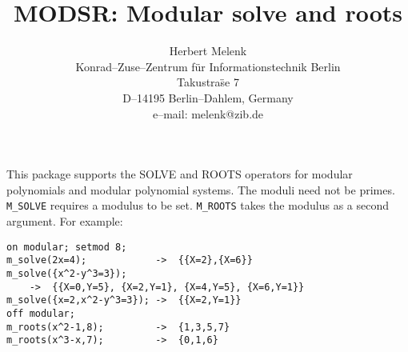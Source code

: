 \documentclass[12pt]{article}
\title{MODSR: Modular solve and roots}
\author{
Herbert Melenk \\
Konrad--Zuse--Zentrum f\"ur Informationstechnik Berlin \\
Takustra\"se 7 \\
D--14195 Berlin--Dahlem, Germany \\[0.05in]
e--mail: melenk@zib.de
}
\begin{document}
\maketitle

This package supports the SOLVE and ROOTS operators for modular polynomials
and modular polynomial systems.  The moduli need not be primes.  {\tt
M\_SOLVE} requires a modulus to be set.  {\tt M\_ROOTS} takes the
modulus as a second argument. For example:

\begin{verbatim}
on modular; setmod 8;
m_solve(2x=4);            ->  {{X=2},{X=6}}
m_solve({x^2-y^3=3});
    ->  {{X=0,Y=5}, {X=2,Y=1}, {X=4,Y=5}, {X=6,Y=1}}
m_solve({x=2,x^2-y^3=3}); ->  {{X=2,Y=1}}
off modular;
m_roots(x^2-1,8);         ->  {1,3,5,7}
m_roots(x^3-x,7);         ->  {0,1,6}
\end{verbatim}
\end{document}
